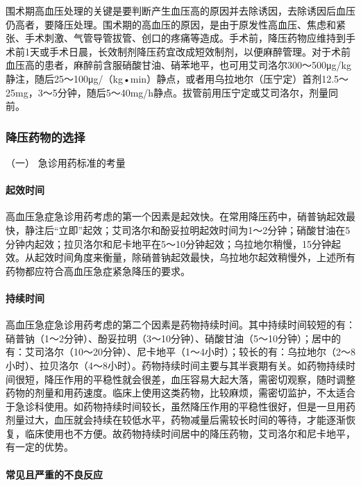 围术期高血压处理的关键是要判断产生血压高的原因并去除诱因，去除诱因后血压仍高者，要降压处理。围术期的高血压的原因，是由于原发性高血压、焦虑和紧张、手术刺激、气管导管拔管、创口的疼痛等造成。手术前，降压药物应维持到手术前1天或手术日晨，长效制剂降压药宜改成短效制剂，以便麻醉管理。对于术前血压高的患者，麻醉前含服硝酸甘油、硝苯地平，也可用艾司洛尔300～500μg/kg静注，随后25～100μg/（kg•min）静点，或者用乌拉地尔（压宁定）首剂12.5～25mg，3～5分钟，随后5～40mg/h静点。拔管前用压宁定或艾司洛尔，剂量同前。

\subsubsection{降压药物的选择}

\hypertarget{text00108.htmlux5cux23CHP4-7-3-2-1}{}
（一） 急诊用药标准的考量

\paragraph{起效时间}

高血压急症急诊用药考虑的第一个因素是起效快。在常用降压药中，硝普钠起效最快，静注后“立即”起效；艾司洛尔和酚妥拉明起效时间为1～2分钟；硝酸甘油在5分钟内起效；拉贝洛尔和尼卡地平在5～10分钟起效；乌拉地尔稍慢，15分钟起效。从起效时间角度来衡量，除硝普钠起效最快，乌拉地尔起效稍慢外，上述所有药物都应符合高血压急症紧急降压的要求。

\paragraph{持续时间}

高血压急症急诊用药考虑的第二个因素是药物持续时间。其中持续时间较短的有：硝普钠（1～2分钟）、酚妥拉明（3～10分钟）、硝酸甘油（5～10分钟）；居中的有：艾司洛尔（10～20分钟）、尼卡地平（1～4小时）；较长的有：乌拉地尔（2～8小时）、拉贝洛尔（4～8小时）。药物持续时间主要与其半衰期有关。如药物持续时间很短，降压作用的平稳性就会很差，血压容易大起大落，需密切观察，随时调整药物的剂量和用药速度。临床上使用这类药物，比较麻烦，需密切监护，不太适合于急诊科使用。如药物持续时间较长，虽然降压作用的平稳性很好，但是一旦用药剂量过大，血压就会持续在较低水平，药物减量后需较长时间的等待，才能逐渐恢复，临床使用也不方便。故药物持续时间居中的降压药物，艾司洛尔和尼卡地平，有一定的优势。

\paragraph{常见且严重的不良反应}

